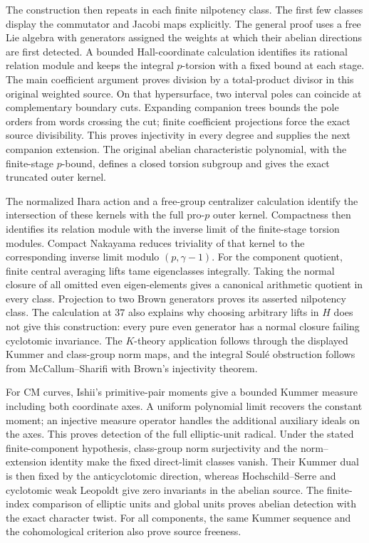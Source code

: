 \documentclass[11pt]{article}
\theoremstyle{definition}\newtheorem{definition}[theorem]{Definition}
\begin{document}
The construction then repeats in each finite nilpotency class. The first few classes display the commutator and Jacobi maps explicitly. The general proof uses a free Lie algebra with generators assigned the weights at which their abelian directions are first detected. A bounded Hall-coordinate calculation identifies its rational relation module and keeps the integral $p$-torsion with a fixed bound at each stage. The main coefficient argument proves division by a total-product divisor in this original weighted source. On that hypersurface, two interval poles can coincide at complementary boundary cuts. Expanding companion trees bounds the pole orders from words crossing the cut; finite coefficient projections force the exact source divisibility. This proves injectivity in every degree and supplies the next companion extension. The original abelian characteristic polynomial, with the finite-stage $p$-bound, defines a closed torsion subgroup and gives the exact truncated outer kernel.

The normalized Ihara action and a free-group centralizer calculation identify the intersection of these kernels with the full pro-$p$ outer kernel. Compactness then identifies its relation module with the inverse limit of the finite-stage torsion modules. Compact Nakayama reduces triviality of that kernel to the corresponding inverse limit modulo $(p,\gamma-1)$. For the component quotient, finite central averaging lifts tame eigenclasses integrally. Taking the normal closure of all omitted even eigen-elements gives a canonical arithmetic quotient in every class. Projection to two Brown generators proves its asserted nilpotency class. The calculation at $37$ also explains why choosing arbitrary lifts in $H$ does not give this construction: every pure even generator has a normal closure failing cyclotomic invariance. The $K$-theory application follows through the displayed Kummer and class-group norm maps, and the integral Soul\'e obstruction follows from McCallum--Sharifi with Brown's injectivity theorem.

For CM curves, Ishii's primitive-pair moments give a bounded Kummer measure including both coordinate axes. A uniform polynomial limit recovers the constant moment; an injective measure operator handles the additional auxiliary ideals on the axes. This proves detection of the full elliptic-unit radical. Under the stated finite-component hypothesis, class-group norm surjectivity and the norm--extension identity make the fixed direct-limit classes vanish. Their Kummer dual is then fixed by the anticyclotomic direction, whereas Hochschild--Serre and cyclotomic weak Leopoldt give zero invariants in the abelian source. The finite-index comparison of elliptic units and global units proves abelian detection with the exact character twist. For all components, the same Kummer sequence and the cohomological criterion also prove source freeness.
\end{document}
